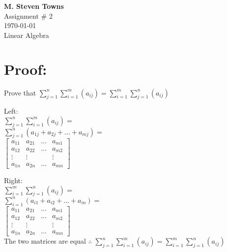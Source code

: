 \documentclass{report}
\begin{document}
\begin{center}
\textbf{M. Steven Towns}\\
Assignment \# 2\\
\today\\
Linear Algebra\\

\end{center}
\hrulefill
\section*{Proof:}
Prove that
$
	\sum\limits_{j=1}^n \sum\limits_{i=1}^m(a_{ij})=
	\sum\limits_{i=1}^m \sum\limits_{j=1}^n(a_{ij})
$
\\
\begin{center}
	Left:
	\\
	$
		\sum\limits_{j=1}^n \sum\limits_{i=1}^m(a_{ij})=
		$
		\\
		$
		\sum\limits_{j=1}^n(a_{1j}+a_{2j}+\hdots+a_{mj})=
	$
\\
	$
		\begin{bmatrix}
			a_{11} & a_{21} & \hdots & a_{m1}\\
			a_{12} & a_{22} & \hdots & a_{m2}\\
			\vdots & \vdots &  & \vdots\\
			a_{1n} & a_{2n} & \hdots & a_{mn}
		\end{bmatrix}
	$
\end{center}
\begin{center}
\end{center}
\begin{center}
	Right:\\
	$
		\sum\limits_{i=1}^m \sum\limits_{j=1}^n(a_{ij})=
	$
	\\
	$
		\sum\limits_{i=1}^n(a_{i1}+a_{i2}+\hdots+a_{in})=
	$
	\\
	$
		\begin{bmatrix}
			a_{11} & a_{21} & \hdots & a_{m1}\\
			a_{12} & a_{22} & \hdots & a_{m2}\\
			\vdots & \vdots &  & \vdots\\
			a_{1n} & a_{2n} & \hdots & a_{mn}
		\end{bmatrix}
	$\\
	The two matrices are equal $\therefore $ 
	$
		\sum\limits_{j=1}^n \sum\limits_{i=1}^m(a_{ij})=
		\sum\limits_{i=1}^m \sum\limits_{j=1}^n(a_{ij})
	$
\end{center}
\end{document}

